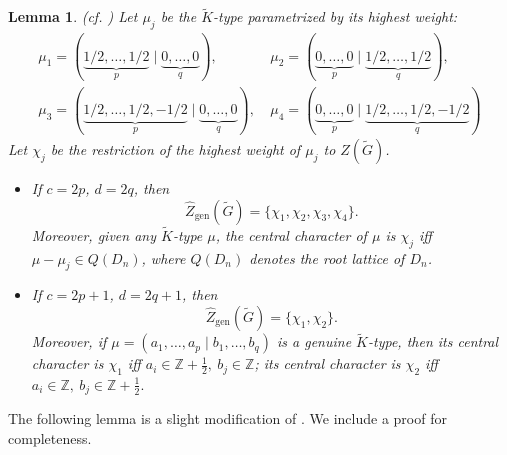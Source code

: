 \documentclass{amsart}
\newcommand{\bbZ}{{\mathbb Z}}
\newtheorem{lemma}[thm]{Lemma}
\theoremstyle{definition}
\newcommand{\tu}{\widetilde}
\begin{document}
\begin{lemma}\textup{(cf. \cite[Lemma~6.3]{BTs18})}
 \label{l:central-char}
Let $\mu_j$ be the $\tu K$-type parametrized by its highest weight:
\begin{align*}
    \mu_1 = (\underbrace{1/2,\dots,1/2}_p \mid \underbrace{0,\dots, 0}_q),\ 
     &\mu_2 = (\underbrace{0,\dots, 0}_p \mid \underbrace{1/2,\dots, 1/2}_q),\\
     \mu_3 = (\underbrace{1/2,\dots,1/2, -1/2}_p \mid \underbrace{0,\dots, 0}_q),\ 
     &\mu_4 = (\underbrace{0,\dots, 0}_p \mid \underbrace{1/2,\dots, 1/2, -1/2}_q)
\end{align*}
Let $\chi_j$ be the restriction of the highest weight of $\mu_j$ to $Z(\tu G)$.
\begin{itemize}
    \item[(1)] If $c=2p$, $d=2q$, then $$\widehat Z_{\mathrm{gen}}(\widetilde G)=\{\chi_1, \chi_2, \chi_3, \chi_4\}.$$ Moreover, given any  $\tu K$-type $\mu$, the central character of $\mu$
is $\chi_j$ iff $\mu-\mu_j \in Q(D_n)$, where $Q(D_n)$ denotes the root lattice of $D_n$.

    
      \item[(2)] If $c=2p+1$, $d=2q+1$, then $$\widehat Z_{\mathrm{gen}}(\widetilde G)=\{\chi_1, \chi_2\}.$$
  Moreover,  if $\mu=(a_1,\ldots,a_p\mid b_1,\ldots,b_q)$
is a genuine $\tu K$-type, then its central character is $\chi_1$
iff
$a_i\in\bbZ+\frac12,\  b_j\in\bbZ$; 
its central character is $\chi_2$  iff  $a_i\in\bbZ,\  b_j\in\bbZ+\frac12.$
      
\end{itemize}

\end{lemma}



The following lemma is a slight modification of \cite[Lemma 6.8]{BTs18}. We include a proof for completeness.
\end{document}
